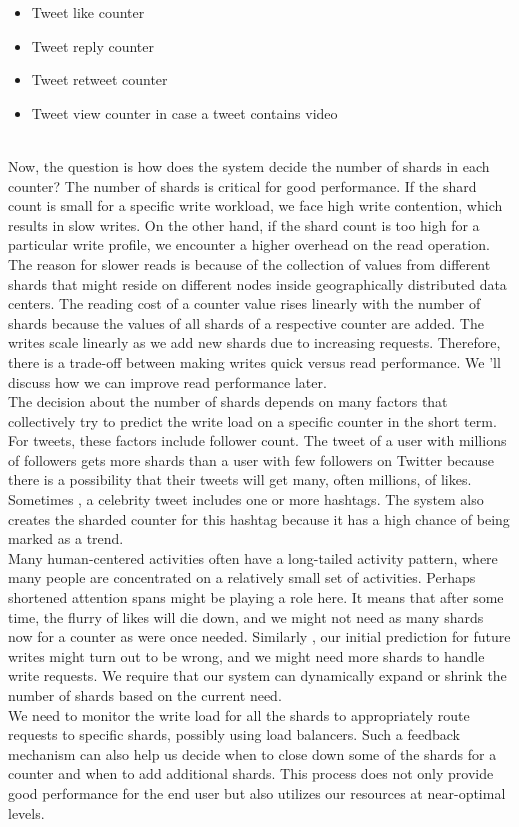 \begin{itemize}
\item
\protect{}\label{GrRtuZAnAbbcpZPGsv4Bb}
Tweet like counter
\item
\protect{}\label{LKg4Wfy-qtXKZtOL9EWoy}
Tweet reply counter
\item
\protect{}\label{qWgrY7LLOoGInEKN-kd-E}
Tweet retweet counter
\item
\protect{}\label{CHlwNL_VGXuOvXuYnh-ZJ}
Tweet view counter in case a tweet contains video
\end{itemize}
\\
Now, the question is how does the system decide the number of shards in each counter? The number of shards is critical for good performance. If the shard count is small for a specific write workload, we face high write contention, which results in slow writes. On the other hand, if the shard count is too high for a particular write profile, we encounter a higher overhead on the read operation. The reason for slower reads is because of the collection of values from different shards that might reside on different nodes inside geographically distributed data centers. The reading cost of a counter value rises linearly with the number of shards because the values of all shards of a respective counter are added. The writes scale linearly as we add new shards due to increasing requests. Therefore, there is a trade-off between making writes quick versus read performance. We 'll discuss how we can improve read performance later.
\\
The decision about the number of shards depends on many factors that collectively try to predict the write load on a specific counter in the short term. For tweets, these factors include follower count. The tweet of a user with millions of followers gets more shards than a user with few followers on Twitter because there is a possibility that their tweets will get many, often millions, of likes. Sometimes , a celebrity tweet includes one or more hashtags. The system also creates the sharded counter for this hashtag because it has a high chance of being marked as a trend.
\\
Many human-centered activities often have a long-tailed activity pattern, where many people are concentrated on a relatively small set of activities. Perhaps shortened attention spans might be playing a role here. It means that after some time, the flurry of likes will die down, and we might not need as many shards now for a counter as were once needed. Similarly , our initial prediction for future writes might turn out to be wrong, and we might need more shards to handle write requests. We require that our system can dynamically expand or shrink the number of shards based on the current need.
\\
We need to monitor the write load for all the shards to appropriately route requests to specific shards, possibly using load balancers. Such a feedback mechanism can also help us decide when to close down some of the shards for a counter and when to add additional shards. This process does not only provide good performance for the end user but also utilizes our resources at near-optimal levels.

